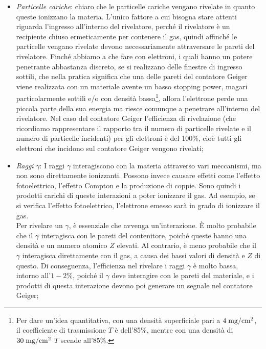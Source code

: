 \begin{itemize}[leftmargin=0.5cm]
   \item \textit{Particelle cariche}: \E chiaro che le particelle cariche vengano rivelate in quanto queste ionizzano la materia. L'unico fattore a cui bisogna stare attenti riguarda l'ingresso all'interno del rivelatore, perché il rivelatore è un recipiente chiuso ermeticamente per contenere il gas, quindi affinché le particelle vengano rivelate devono necessariamente attraversare le pareti del rivelatore. Finché abbiamo a che fare con elettroni, i quali hanno un potere penetrante abbastanza discreto, se si realizzano delle finestre di ingresso sottili, che nella pratica significa che una delle pareti del contatore Geiger viene realizzata con un materiale avente un basso stopping power, magari particolarmente sottili e/o con densità bassa\footnote{Per dare un'idea quantitativa, con una densità superficiale pari a $4 \; \rm mg/cm^2$, il coefficiente di trasmissione $T$ è dell'85\%, mentre con una densità di $30 \; \rm mg/cm^2$ $T$ scende all'85\%.}, allora l'elettrone perde una piccola parte della sua energia ma riesce comunque a penetrare all'interno del rivelatore. Nel caso del contatore Geiger l'efficienza di rivelazione (che ricordiamo rappresentare il rapporto tra il numero di particelle rivelate e il numero di particelle incidenti) per gli elettroni è del 100\%, cioè tutti gli elettroni che incidono sul contatore Geiger vengono rivelati;
   \item \textit{Raggi }$\gamma$: I raggi $\gamma$ interagiscono con la materia attraverso vari meccanismi, ma non sono direttamente ionizzanti. Possono invece causare effetti come l'effetto fotoelettrico, l'effetto Compton e la produzione di coppie. Sono quindi i prodotti carichi di queste interazioni a poter ionizzare il gas. Ad esempio, se si verifica l'effetto fotoelettrico, l'elettrone emesso sarà in grado di ionizzare il gas.\\
   Per rivelare un $\gamma$, è essenziale che avvenga un'interazione. È molto probabile che il $\gamma$ interagisca con le pareti del contenitore, poiché queste hanno una densità e un numero atomico $Z$ elevati. Al contrario, è meno probabile che il $\gamma$ interagisca direttamente con il gas, a causa dei bassi valori di densità e $Z$ di questo. Di conseguenza, l'efficienza nel rivelare i raggi $\gamma$ è molto bassa, intorno all'$1-2\%$, poiché il $\gamma$ deve interagire con le pareti del materiale, e i prodotti di questa interazione devono poi generare un segnale nel contatore Geiger;
\end{itemize}
